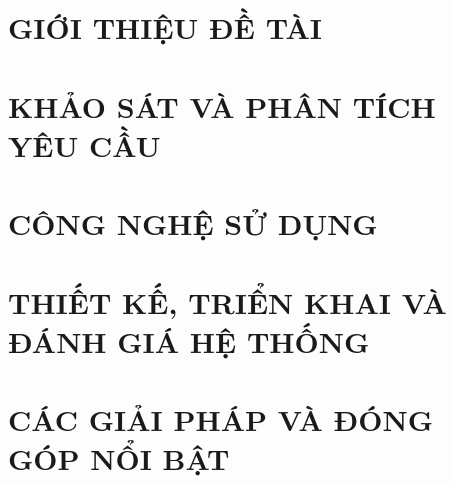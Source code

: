 \documentclass[a4paper,13pt,3p,twoside]{report}
\theoremstyle{definition}
\begin{document}
\glsaddall 
 \renewcommand*{\glossaryname}{Danh sách thuật ngữ}
\renewcommand*{\acronymname}{DANH MỤC THUẬT NGỮ VÀ TỪ VIẾT TẮT}
\renewcommand*{\entryname}{Thuật ngữ}
\renewcommand*{\descriptionname}{Ý nghĩa}
\printnoidxglossaries


% 


\newpage
{}

\pagestyle{fancy}
\fancyhf{}
\fancyhead[RE, LO]{\leftmark}
\fancyfoot[RE, LO]{\thepage}

\chapter{GIỚI THIỆU ĐỀ TÀI}
\label{chapter:Introduction}

\newpage
\chapter{KHẢO SÁT VÀ PHÂN TÍCH YÊU CẦU}
\label{chapter:Related_works}



\newpage
\chapter{CÔNG NGHỆ SỬ DỤNG}
\label{chapter:Methodology}


\newpage
\chapter{THIẾT KẾ, TRIỂN KHAI VÀ ĐÁNH GIÁ HỆ THỐNG}
\label{chapter:Experiment}


\newpage
\chapter{CÁC GIẢI PHÁP VÀ ĐÓNG GÓP NỔI BẬT}
\label{chapter:SolutionAndContribution}

\newpage
\end{document}
